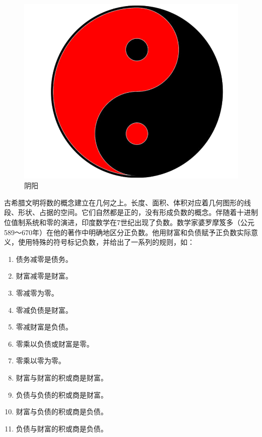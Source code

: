 \documentclass[b5paper]{ctexart}
\begin{document}
\begin{figure}[htbp]
 \centering
 \includegraphics[scale=0.1]{img/yinyang}
 \caption{阴阳}
 \label{fig:yinyang}
\end{figure}

古希腊文明将数的概念建立在几何之上。长度、面积、体积对应着几何图形的线段、形状、占据的空间。它们自然都是正的，没有形成负数的概念。伴随着十进制位值制系统和零的演进，印度数学在7世纪出现了负数。数学家婆罗摩笈多（公元589～670年）在他的著作中明确地区分正负数。他用财富和负债赋予正负数实际意义，使用特殊的符号标记负数，并给出了一系列的规则，如\cite{Rogers-2011}：

\begin{multicols}{2}
\begin{enumerate}[1)]
\item 债务减零是债务。
\item 财富减零是财富。
\item 零减零为零。
\item 零减负债是财富。
\item 零减财富是负债。
\item 零乘以负债或财富是零。
\item 零乘以零为零。
\item 财富与财富的积或商是财富。
\item 负债与负债的积或商是财富。
\item 财富与负债的积或商是负债。
\item 负债与财富的积或商是负债。
\end{enumerate}
\end{multicols}
\end{document}
